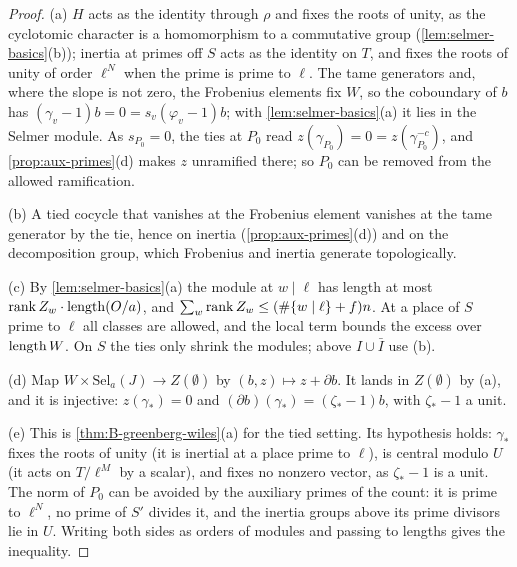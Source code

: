 \begin{proof}
(a) $H$ acts as the identity through $\rho$ and fixes the roots of unity, as the cyclotomic character is a homomorphism to a commutative group (\cref{lem:selmer-basics}(b)); inertia at primes off $S$ acts as the identity on $T$, and fixes the roots of unity of order $\ell^N$ when the prime is prime to $\ell$. The tame generators and, where the slope is not zero, the
Frobenius elements fix $W$, so the coboundary of $b$ has $(\gamma_v-1)b=0=s_v(\varphi_v-1)b$; with \cref{lem:selmer-basics}(a) it lies in the Selmer module. As $s_{P_0}=0$, the ties at $P_0$ read $z(\gamma_{P_0})=0=z(\gamma_{P_0}^{-c})$, and \cref{prop:aux-primes}(d) makes $z$ unramified there; so $P_0$ can be removed from the
allowed ramification.

(b) A tied cocycle that vanishes at the Frobenius element vanishes at the tame generator by the tie, hence on inertia (\cref{prop:aux-primes}(d)) and on the decomposition group, which Frobenius and inertia generate topologically.

(c) By \cref{lem:selmer-basics}(a) the module at $w\mid\ell$ has length at most $\operatorname{rank} Z_w\cdot\operatorname{length}(O/a)$, and $\sum_w\operatorname{rank} Z_w\le(\#\{w\mid\ell\}+f)n$. At a place of $S$ prime to $\ell$ all classes are allowed, and the local term bounds the excess over $\operatorname{length} W$. On $S$ the ties only shrink the modules; above $I\cup\bar I$ use (b).

(d) Map $W\times\mathrm{Sel}_a(J)\to Z(\emptyset)$ by $(b,z)\mapsto z+\partial b$. It lands in $Z(\emptyset)$ by (a), and it is injective: $z(\gamma_*)=0$ and $(\partial b)(\gamma_*)=(\zeta_*-1)b$, with $\zeta_*-1$ a unit.

(e) This is \cref{thm:B-greenberg-wiles}(a) for the tied setting. Its hypothesis holds: $\gamma_*$ fixes the roots of unity (it is inertial at a place prime to $\ell$), is central modulo $U$ (it acts on $T/\ell^M$ by a scalar), and fixes no nonzero vector, as $\zeta_*-1$ is a unit. The norm of $P_0$ can be avoided by the auxiliary primes of the count:
it is prime to $\ell^N$, no prime of $S'$ divides it, and the inertia groups above its prime divisors lie in $U$. Writing both sides as orders of modules and passing to lengths gives the inequality.
\end{proof}

